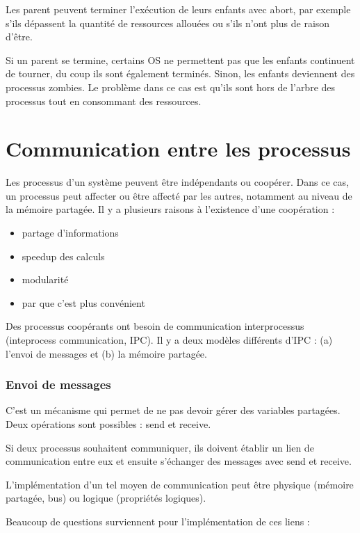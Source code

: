 Les parent peuvent terminer l'exécution de leurs enfants avec abort, par exemple s'ils dépassent la quantité de ressources allouées ou s'ils n'ont plus de raison d'être.

Si un parent se termine, certains OS ne permettent pas que les enfants continuent de tourner, du coup ils sont également terminés. Sinon, les enfants deviennent des processus zombies. Le problème dans ce cas est qu'ils sont hors de l'arbre des processus tout en consommant des ressources.

\section{Communication entre les processus}

Les processus d'un système peuvent être indépendants ou coopérer. Dans ce cas, un processus peut affecter ou être affecté par les autres, notamment au niveau de la mémoire partagée. Il y a plusieurs raisons à l'existence d'une coopération :

\begin{itemize}
	\item partage d'informations
	\item speedup des calculs
	\item modularité
	\item par que c'est plus convénient
\end{itemize}

Des processus coopérants ont besoin de communication interprocessus (inteprocess communication, IPC). Il y a deux modèles différents d'IPC : (a) l'envoi de messages et (b) la mémoire partagée.


	\subsubsection{Envoi de messages}
	
	C'est un mécanisme qui permet de ne pas devoir gérer des variables partagées. Deux opérations sont possibles : send et receive.
	
	Si deux processus souhaitent communiquer, ils doivent établir un lien de communication entre eux et ensuite s'échanger des messages avec send et receive.
	
	L'implémentation d'un tel moyen de communication peut être physique (mémoire partagée, bus) ou logique (propriétés logiques).
	
	Beaucoup de questions surviennent pour l'implémentation de ces liens :
	
